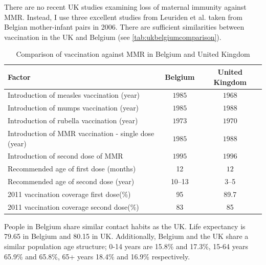 \documentclass[a4paper,11pt] {scrartcl}
\begin{document}
There are no recent UK studies examining loss of maternal immunity against MMR. Instead, I use three excellent studies from Leuriden et al.\cite{leuridan2010early,leuridan2011kinetics,leuridan2012maternal} taken from Belgian mother-infant pairs in 2006. There are sufficient similarities between vaccination in the UK and Belgium (see \autoref{tab:ukbelgiumcomparison}).
\begin{table} [h]
\centering
\begin{tabular}{l c c}
\toprule
Factor&Belgium&United Kingdom\\
\midrule
Introduction of measles vaccination (year) &$1985$\cite{eurosurveillancemeaslesbelgium} &$1968$\cite{hpaimmunistationcoverage}\\
Introduction of mumps vaccination (year) &$1985$\cite{theeten2011we} &$1988$\cite{hpaimmunistationcoverage}\\
Introduction of rubella vaccination (year) & $1973$\cite{theeten2011we} &$1970$\cite{pebody2001seroepidemiology}\\
Introduction of MMR vaccination - single dose (year) & $1985$\cite{theeten2011we} &$1988$\cite{hpaimmunistationcoverage}\\
Introduction of second dose of MMR & $1995$\cite{theeten2011we} &$1996$\cite{cohen2007vaccine}\\
Recommended age of first dose (months) & 12\cite{eurosurveillancemeaslesbelgium} &$12$\cite{nhschoicesvaccinationmmr,nhschoicesvaccinationdates}\\
Recommended age of second dose (year) &10--13\cite{eurosurveillancemeaslesbelgium}&3--5\cite{nhschoicesvaccinationmmr,nhschoicesvaccinationdates}\\
2011 vaccination coverage first dose(\%) &95\cite{whoimmunizationprofilebelgium}&89.7\cite{vaccinationcoverage2011}\\
2011 vaccination coverage second dose(\%) &83\cite{whoimmunizationprofilebelgium}&85\cite{vaccinationcoverage2011}\\
\bottomrule
\end{tabular}
\caption{Comparison of vaccination against MMR in Belgium and United Kingdom}
\label{tab:ukbelgiumcomparison}
\end{table}
People in Belgium share similar contact habits as the UK\cite{mossong2008social}. Life expectancy is 79.65 in Belgium and 80.15 in UK. Additionally, Belgium and the UK share a similar population age structure; 0-14 years are 15.8\% and 17.3\%, 15-64 years 65.9\% and 65.8\%, 65+ years 18.4\% and 16.9\% respectively\cite{worldfactbookbelgium,worldfactbookuk}.
\end{document}
